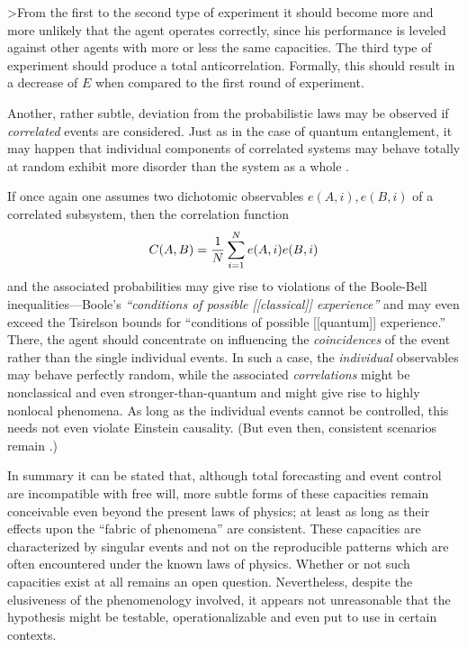 >From the first to the second type of experiment it should become more
and
more unlikely that the agent operates correctly, since his performance
is leveled against other agents with more or less the same capacities.
The third type of experiment should produce a
total anticorrelation.
Formally, this should result in a decrease of $E$
when compared to the first round of experiment.


Another, rather subtle, deviation from the probabilistic
laws may be observed if {\em correlated} events are considered.
Just as in the case of quantum entanglement,
it may happen that individual components of correlated systems may behave
totally at random
exhibit more disorder than the system as a whole
\cite{nielsen-kem-2001}.

If once again one assumes two dichotomic observables $e(A,i),e(B,i)$
of a correlated subsystem, then the correlation function
$$C(A,B) = {1\over N}\sum_{i=1}^N e(A,i)e(B,i)$$
and the associated probabilities
may give rise to violations of the Boole-Bell inequalities---Boole's
{\em ``conditions of possible [[classical]] experience''}
\cite{Boole-62,Hailperin,pitowsky,Pit-94}
and may even exceed \cite{svozil-krenn}
the Tsirelson  bounds \cite{cirelson:80,cirelson:87,cirelson}
for ``conditions of possible [[quantum]] experience.''
There, the agent should concentrate on influencing the {\em coincidences}
of the event rather than the single individual events.
In such a case, the {\em individual} observables may behave perfectly random,
while the associated {\em correlations} might be nonclassical and even
stronger-than-quantum and might give rise to highly nonlocal phenomena.
As long as the individual events cannot be controlled,
this needs not even violate Einstein causality.
(But even then, consistent scenarios remain \cite{svozil-relrel}.)

In summary it can be stated that, although total forecasting and event control
are incompatible with free will, more subtle forms of these capacities remain
conceivable even beyond the present laws of physics; at least
as long as their effects upon the ``fabric of phenomena''
are consistent.
These capacities are characterized by singular events and not on the
reproducible patterns which are often encountered under the known laws
of physics.
Whether or not such capacities exist at all remains an open
question.
Nevertheless, despite the elusiveness of the phenomenology involved,
it appears not unreasonable that the hypothesis might be
testable, operationalizable and even put to use in certain contexts.


